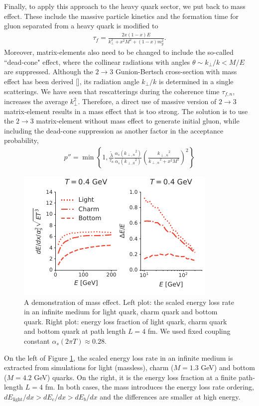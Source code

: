 \documentclass[aps, prc, reprint, amsmath, groupedaddress, nofootinbib]{revtex4-1}
\begin{document}
Finally, to apply this approach to the heavy quark sector, we put back to mass effect. 
These include the massive particle kinetics and the formation time for gluon separated from a heavy quark is modified to
\begin{eqnarray}
\tau_{f} = \frac{2x(1-x)E}{k_\perp^2 + x^2M^2 + (1-x)m_g^2}.
\end{eqnarray}
Moreover, matrix-elements also need to be changed to include the so-called ``dead-cone" effect, where the collinear radiations with angles $\theta \sim k_\perp/k < M/E$ are suppressed. 
Although the $2\rightarrow3$ Gunion-Bertsch cross-section with mass effect has been derived [], its radiation angle $k_\perp/k$ is determined in a single scatterings.
We have seen that rescatterings during the coherence time $\tau_{f,n}$, increases the average $k_{\perp}^2$. Therefore, a direct use of massive version of $2\rightarrow3$ matrix-element results in a mass effect that is too strong.
The solution is to use the $2\rightarrow3$ matrix-element without mass effect to generate initial gluon, while including the dead-cone suppression as another factor in the acceptance probability,
\begin{eqnarray}
p'' = \min\left\{1, \frac{\tilde{\lambda}}{\tau_n}\frac{\alpha_s({k_{\perp,n}}^2)}{\alpha_s({k_{\perp,0}}^2)} \left(\frac{{k_{\perp,n}}^2}{{k_{\perp,n}}^2+x^2 M^2}\right)^2\right\}
\end{eqnarray}
\begin{figure}
\includegraphics[width=\columnwidth]{Eloss_mass.pdf}
\caption{A demonstration of mass effect. Left plot: the scaled energy loss rate in an infinite medium for light quark, charm quark and bottom quark. Right plot: energy loss fraction of light quark, charm quark and bottom quark at path length $L=4$ fm. We used fixed coupling constant $\alpha_s(2\pi T) \approx 0.28$. }
\label{fig:mass}
\end{figure}
On the left of Figure \ref{fig:mass}, the scaled energy loss rate in an infinite medium is extracted from simulations for light (massless), charm ($M=1.3$ GeV) and bottom ($M=4.2$ GeV) quarks. 
On the right, it is the energy loss fraction at a finite path-length $L=4$ fm.
In both cases, the mass introduces the energy loss rate ordering, $dE_{\textrm{light}}/dx > dE_c/dx > dE_b/dx$ and the differences are smaller at high energy.
\end{document}
